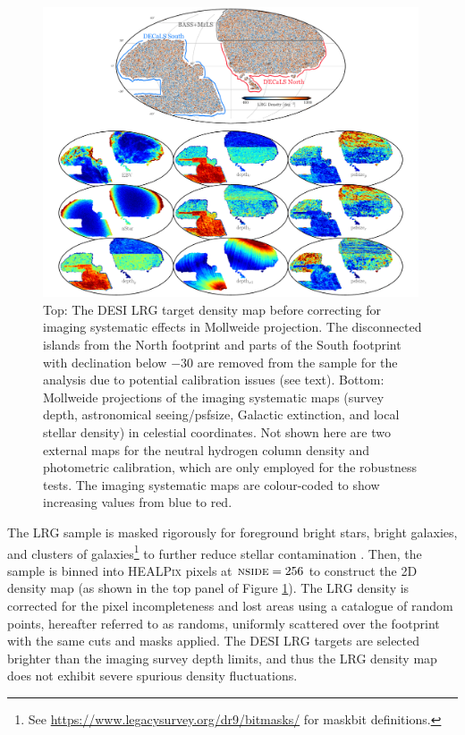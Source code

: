\begin{figure}
 \centering
 \includegraphics[width=0.99\textwidth]{figures/dr9data.pdf}
 \caption{Top: The DESI LRG target density map before correcting for imaging systematic effects in Mollweide projection. The disconnected islands from the North footprint and parts of the South footprint with declination below $-30$ are removed from the sample for the analysis due to potential calibration issues (see text). Bottom: Mollweide projections of the imaging systematic maps (survey depth, astronomical seeing/psfsize, Galactic extinction, and local stellar density) in celestial coordinates. Not shown here are two external maps for the neutral hydrogen column density and photometric calibration, which are only employed for the robustness tests. The imaging systematic maps are colour-coded to show increasing values from blue to red.}
 \label{fig:ng}
\end{figure}

The LRG sample is masked rigorously for foreground bright stars, bright galaxies, and clusters of galaxies\footnote{See \url{https://www.legacysurvey.org/dr9/bitmasks/} for maskbit definitions.} to further reduce stellar contamination \citep{zhou2022target}. Then, the sample is binned into \textsc{HEALPix} \citep{gorski2005healpix} pixels at $\textsc{nside}=256$ to construct the 2D density map (as shown in the top panel of Figure \ref{fig:ng}). The LRG density is corrected for the pixel incompleteness and lost areas using a catalogue of random points, hereafter referred to as randoms, uniformly scattered over the footprint with the same cuts and masks applied. The DESI LRG targets are selected brighter than the imaging survey depth limits, and thus the LRG density map does not exhibit severe spurious density fluctuations.

